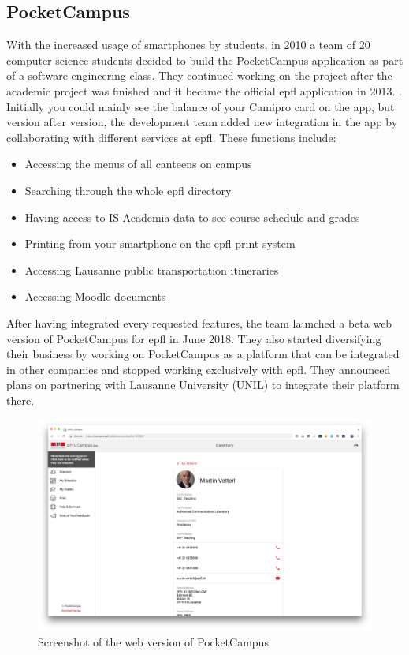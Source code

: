 \documentclass[twoside, openright,11pt,a4paper]{book}
\begin{document}
\subsection{PocketCampus}
With the increased usage of smartphones by students, in 2010 a team of 20 computer science students decided to build the PocketCampus application as part of a software engineering class. They continued working on the project after the academic project was finished and it became the official \gls{epfl} application in 2013. \cite{camipro:creation}. \\

Initially you could mainly see the balance of your Camipro card on the app, but version after version, the development team added new integration in the app by collaborating with different services at \gls{epfl}.
These functions include:
\begin{itemize}
    \item Accessing the menus of all canteens on campus
    \item Searching through the whole \gls{epfl} directory
    \item Having access to IS-Academia data to see course schedule and grades
    \item Printing from your smartphone on the \gls{epfl} print system
    \item Accessing Lausanne public transportation itineraries
    \item Accessing Moodle documents
\end{itemize}

After having integrated every requested features, the team launched a beta web version of PocketCampus for \gls{epfl} in June 2018. They also started diversifying their business by working on PocketCampus as a platform that can be integrated in other companies and stopped working exclusively with \gls{epfl}. They announced plans on partnering with Lausanne University (UNIL) to integrate their platform there.

\begin{figure}[H]
\begin{center}
	\includegraphics[width=.8\textwidth]{assets/web_pocketcampus.png}
	\caption{Screenshot of the web version of PocketCampus}
\end{center}
\end{figure}
\end{document}
